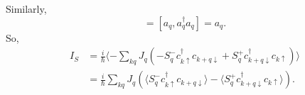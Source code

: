 \documentclass[11pt,a4paper]{article}
\begin{document}
Similarly,
\begin{equation}
[a_{q}, \sum_{q^{\prime}} a_{q^{\prime}}^{+} a_{q^{\prime}}]=[a_{q}, a_{q}^{\dagger} a_{q}]=a_{q}.
\label{eq:1-1}
\end{equation}
So,
\begin{equation}
\begin{split}
I_{S}&=\frac{i}{\hbar}\langle -\sum_{k q} J_{q}\left(-S_{q}^{-} c_{k \uparrow}^{\dagger} c_{k+q\downarrow} + S_{q}^{+} c_{k+q\downarrow}^{\dagger} c_{k \uparrow}\right) \rangle \\
&= \frac{i}{\hbar} \sum_{k q} J_{q}\left( \langle S_{q}^{-} c_{k \uparrow}^{\dagger} c_{k+q\downarrow}\rangle - \langle S_{q}^{+} c_{k+q\downarrow}^{\dagger} c_{k \uparrow}\rangle \right).
\end{split}
\end{equation}
\end{document}
